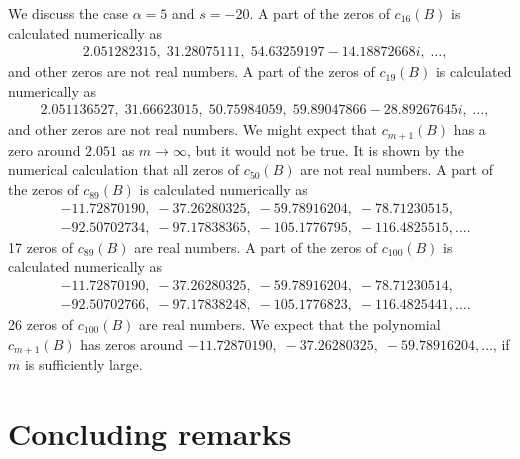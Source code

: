 \documentclass[12pt]{amsart}
\numberwithin{equation}{section}
\theoremstyle{definition}
\theoremstyle{remark}
\begin{document}
We discuss the case $\alpha =5$ and $s=-20$.
A part of the zeros of $c_{16} (B)$ is calculated numerically as
\begin{align*}
& 2.051282315, \; 31.28075111, \; 54.63259197-14.18872668 i, \; \dots ,
\end{align*}
and other zeros are not real numbers.
A part of the zeros of $c_{19} (B)$ is calculated numerically as
\begin{align*}
& 2.051136527, \; 31.66623015, \; 50.75984059, \; 59.89047866-28.89267645i  , \; \dots ,
\end{align*}
and other zeros are not real numbers.
We might expect that $c_{m+1} (B)$ has a zero around $2.051$ as $m \to \infty$, but it would not be true.
It is shown by the numerical calculation that all zeros of $c_{50} (B)$ are not real numbers.
A part of the zeros of $c_{89} (B)$ is calculated numerically as
\begin{align*}
&-11.72870190, \; -37.26280325, \; -59.78916204, \; -78.71230515 ,\\
& -92.50702734, \; -97.17838365, \; -105.1776795 , \; -116.4825515, \dots .
\end{align*}
17 zeros of $c_{89} (B)$ are real numbers.
A part of the zeros of $c_{100} (B)$ is calculated numerically as
\begin{align*}
&-11.72870190, \; -37.26280325, \; -59.78916204, \; -78.71230514 ,\\
&-92.50702766, \; -97.17838248, \; -105.1776823 , \; -116.4825441, \dots .
\end{align*}
26 zeros of $c_{100} (B)$ are real numbers.
We expect that the polynomial $c_{m+1} (B)$ has zeros around $-11.72870190, \; -37.26280325, \; -59.78916204, \dots $, if $m$ is sufficiently large.

\section{Concluding remarks}  \label{sec:rmk}
\end{document}
